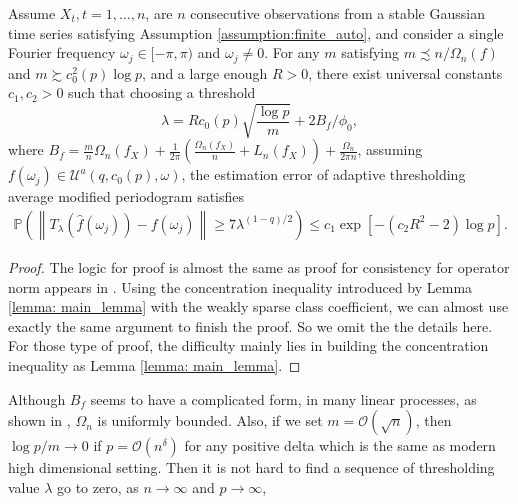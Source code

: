 \begin{prop}
\label{prop: gauss_prop}
Assume ${X}_t, t=1,\ldots,n$, are $n$ consecutive observations from a stable Gaussian time series satisfying Assumption \ref{assumption:finite_auto}, and consider a single Fourier frequency $\omega_j \in [-\pi, \pi)$ and $\omega_j \neq 0$. 
For any $m $ satisfying $m \precsim n/ \Omega_n(f)$ and $m \succsim c_0^2(p)\log p$, and a large enough $R > 0$,  
there exist universal constants $c_1, c_2 > 0$ such that choosing a threshold 
\begin{equation}
\label{eq:threshold_value}
\lambda = R c_0(p)\sqrt{\frac{\log p}{m}} +2B_f/\phi_0, 
\end{equation}
where $B_f = \frac{m}{n}\Omega_n(f_X) + \frac{1}{2\pi}\left(\frac{\Omega_n(f_X)}{n}+L_n(f_X)\right) +\frac{\Omega_n}{2\pi n}$, 
assuming $f(\omega_j)\in \mathcal{U}^a(q, c_0(p), \omega)$, 
the estimation error of adaptive thresholding average modified periodogram satisfies 
\begin{equation}
\begin{aligned}
\mathbb{P}\left(\left\|T_{\lambda}(\hat{f}(\omega_j)) - f(\omega_j)\right\|\ge 7 \lambda^{(1-q)/2} \right)
\le c_1 \exp\left[-(c_2 R^2-2)\log p\right]. \nonumber
\end{aligned}
\end{equation}
\end{prop}

\begin{proof}
The logic for proof is almost the same as proof for consistency for operator norm appears in \cite{sun2018large}. Using the concentration inequality introduced by Lemma \ref{lemma: main_lemma}  with the weakly sparse class coefficient, we can almost use exactly the same argument to finish the proof. So we omit the the details here. For those type of proof, the difficulty mainly lies in building the concentration inequality as Lemma \ref{lemma: main_lemma}. 
\end{proof}

\begin{remark}
Although $B_f$ seems to have a complicated form,  in many linear processes,  as shown in \cite{sun2018large},  $\Omega_n$ is uniformly bounded. Also, if we set $m=\mathcal{O}(\sqrt{n})$, then $\log p/m \rightarrow 0$ if $p = \mathcal{O}(n^\delta)$ for any positive delta which is the same as modern high dimensional setting. Then it is not hard to find a sequence of thresholding value $\lambda$ go to zero, as $n\rightarrow \infty$ and $p\rightarrow \infty$, 
\end{remark}











